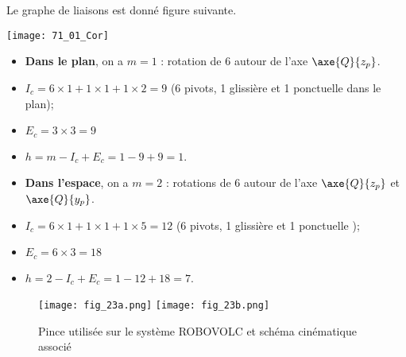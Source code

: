 \normaltrue \difficilefalse \tdifficilefalse
\correctiontrue

\setcounter{question}{0}%


\ifcorrection
\else
{}
\fi


\ifprof

Le graphe de liaisons est donné figure suivante. 

\begin{center}
\texttt{[image: 71\_01\_Cor]}
\end{center}

\begin{itemize}
\item \textbf{Dans le plan}, on a $m=1$ : rotation de 6 autour de l'axe $\axe{Q}{z_p}$.
\item $I_c = 6\times 1 + 1 \times 1 + 1 \times 2 = 9$ (6 pivots, 1 glissière et 1 ponctuelle dans le plan);
\item $E_c = 3 \times 3 = 9$
\item $h=m-I_c+E_c = 1-9+9 = 1$. 
\end{itemize}
\begin{itemize}
\item \textbf{Dans l'espace}, on a $m=2$ : rotations de 6 autour de l'axe $\axe{Q}{z_p}$ et $\axe{Q}{y_p}$.
\item $I_c = 6\times 1 + 1 \times 1 + 1 \times 5 = 12$ (6 pivots, 1 glissière et 1 ponctuelle );
\item $E_c = 6 \times 3 = 18$
\item $h=2-I_c+E_c = 1-12+18 = 7$. 
\end{itemize}
\else
\fi

\ifprof
\else
\begin{figure}[H]
\centering
\texttt{[image: fig\_23a.png]}
\texttt{[image: fig\_23b.png]}
\caption{Pince utilisée sur le système ROBOVOLC et schéma cinématique associé \label{fig_23}}
\end{figure} 
\fi 

\ifprof
\else
\ifcolle
\else
{}
 \fi

\fi